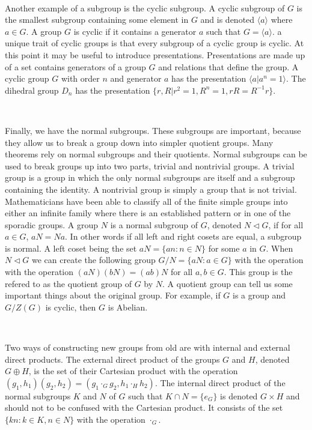 \documentclass[11pt]{article}
\begin{document}
~

Another example of a subgroup is the cyclic subgroup. A cyclic subgroup of $G$ is the smallest subgroup containing some element in $G$ and is denoted $\langle a \rangle$ where $a\in G$. A group $G$ is cyclic if it contains a generator $a$ such that $G=\langle a \rangle$. a unique trait of cyclic groups is that every subgroup of a cyclic group is cyclic. At this point it may be useful to introduce presentations. Presentations are made up of a set contains generators of a group $G$ and relations that define the group. A cyclic group $G$ with order $n$ and generator $a$ has the presentation $\langle a | a^n = 1 \rangle $. The dihedral group $D_n$ has the presentation 
$\{r, R | r^2 = 1, R^n = 1, rR = R^{-1}r\}$.

~

Finally, we have the normal subgroups. These subgroups are important, because they allow us to break a group down into simpler quotient groups. Many theorems rely on normal subgroups and their quotients. Normal subgroups can be used to break groups up into two parts, trivial and nontrivial groups. A trivial group is a group in which the only normal subgroups are itself and a subgroup containing the identity. A nontrivial group is simply a group that is not trivial. Mathematicians have been able to classify all of the finite simple groups into either an infinite family where there is an established pattern or in one of the sporadic groups. A group $N$ is a normal subgroup of $G$, denoted $N \triangleleft G $, if for all $a\in G$, $aN = Na$. In other words if all left and right cosets are equal, a subgroup is normal. A left coset being the set $aN = \{an : n \in N\}$ for some $a$ in $G$. When $N \triangleleft G$ we can create the following group $G/N = \{aN : a\in G\}$ with the operation with the operation $(aN )(bN ) = (ab)N$ for all $a,b \in G$. This group is the refered to as the quotient group of $G$ by $N$. A quotient group can tell us some important things about the original group. For example, if $G$ is a group and $G/Z(G)$ is cyclic, then $G$ is Abelian.

~

Two ways of constructing new groups from old are with internal and external direct products. The external direct product of the groups $G$ and $H$, denoted $G\oplus H$, is the set of their Cartesian product with the operation $(g_1 , h_1 )(g_2 , h_2 ) = (g_1 \cdot_G g_2 , h_1 \cdot_H h_2 )$.  The internal direct product of the normal subgroups $K$ and $N$ of $G$ such that $K\cap N = \{e_G\}$ is denoted $G\times H$ and should not to be confused with the Cartesian product. It consists of the set $\{ kn : k \in K, n \in N \}$ with the operation $\cdot_G$.
\end{document}
